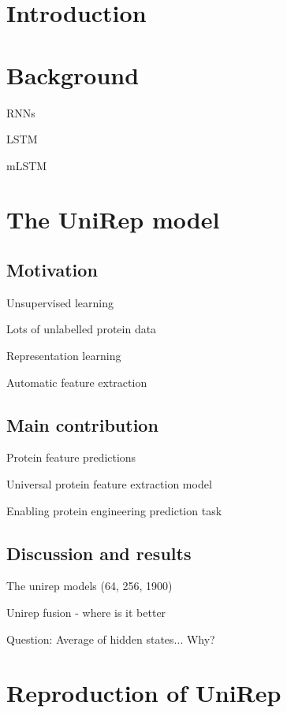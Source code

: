 \documentclass[a4paper,11pt]{article}
\begin{document}


\section{Introduction}

\section{Background}


RNNs

LSTM

mLSTM

\section{The UniRep model}

\subsection{Motivation}

Unsupervised learning

Lots of unlabelled protein data

Representation learning

Automatic feature extraction

\subsection{Main contribution}

Protein feature predictions

Universal protein feature extraction model

Enabling protein engineering prediction task

\subsection{Discussion and results}

The unirep models (64, 256, 1900)

Unirep fusion - where is it better

Question: Average of hidden states... Why?

\section{Reproduction of UniRep}
\end{document}
